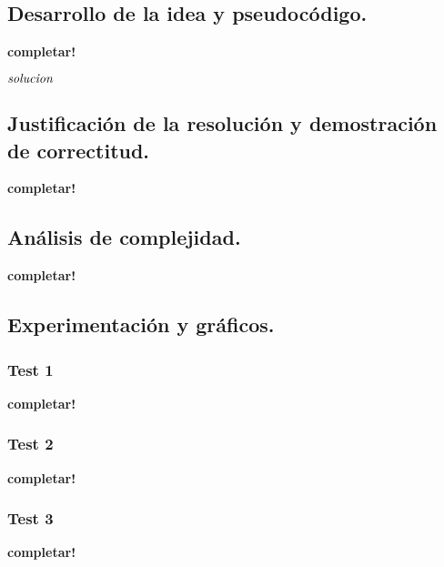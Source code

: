 \newpage
\subsection{Desarrollo de la idea y pseudocódigo.}

\vspace*{0.3cm}

\textbf{completar!}

\begin{codebox}
\li \Return $\id{solucion}$
\end{codebox}



\newpage
\subsection{Justificación de la resolución y demostración de correctitud.}

\vspace*{0.3cm}

\textbf{completar!}



\newpage
\subsection{Análisis de complejidad.}

\vspace*{0.3cm}

\textbf{completar!}



\newpage
\subsection{Experimentación y gráficos.}

\vspace*{0.3cm}

\subsubsection{Test 1}

\vspace*{0.3cm}

\textbf{completar!}


\newpage
\subsubsection{Test 2}

\vspace*{0.3cm}

\textbf{completar!}


\newpage
\subsubsection{Test 3}

\vspace*{0.3cm}

\textbf{completar!}
